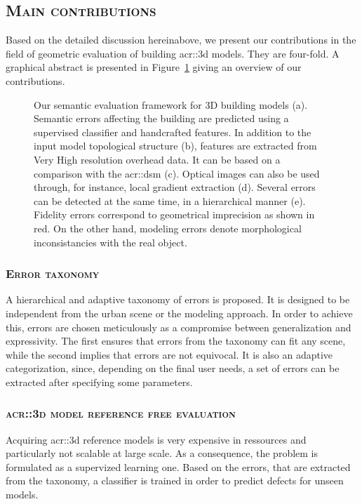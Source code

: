    \subsection{\textsc{Main contributions}}
        \label{sec::introduction::contributions::contributions}
        Based on the detailed discussion hereinabove, we present our contributions in the field of geometric evaluation of building \gls{acr::3d} models.
        They are four-fold.
        A graphical abstract is presented in Figure~\ref{fig::graphical_abstract} giving an overview of our contributions.
        \begin{figure}[htpb]
            \centering
                        
            \caption{
                \label{fig::graphical_abstract} Our semantic evaluation framework for 3D building models (a).
                Semantic errors affecting the building are predicted using a supervised classifier and handcrafted features.
                In addition to the input model topological structure (b), features are extracted from Very High resolution overhead data.
                It can be based on a comparison with the \gls*{acr::dsm} (c).
                Optical images can also be used through, for instance, local gradient extraction (d).
                Several errors can be detected at the same time, in a hierarchical manner (e).
                Fidelity errors correspond to geometrical imprecision as shown in red.
                On the other hand, modeling errors denote morphological inconsistancies with the real object.
            }
        \end{figure}
        \subsubsection{\textsc{Error taxonomy}}
            A hierarchical and adaptive taxonomy of errors is proposed.
            It is designed to be independent from the urban scene or the modeling approach.
            In order to achieve this, errors are chosen meticulously as a compromise between generalization and expressivity.
            The first ensures that errors from the taxonomy can fit any scene, while the second implies that errors are not equivocal.
            It is also an adaptive categorization, since, depending on the final user needs, a set of errors can be extracted after specifying some parameters.
            
        \subsubsection{\textsc{\texorpdfstring{\gls*{acr::3d}}{3D} model reference free evaluation}}
            Acquiring \gls{acr::3d} reference models is very expensive in ressources and particularly not scalable at large scale.
            As a consequence, the problem is formulated as a supervized learning one.
            Based on the errors, that are extracted from the taxonomy, a classifier is trained in order to predict defects for unseen models.

